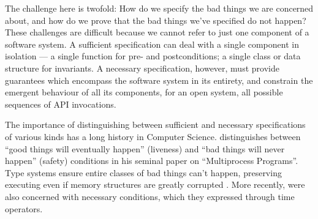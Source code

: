 
The challenge here is twofold: How do we specify the bad things we are
concerned about, and how do we prove that the bad things we've
specified do not happen?  These challenges are difficult because we
cannot refer to just one component of a software system.  A sufficient
specification can deal with a single component in isolation --- a
single function for pre- and postconditions; a single class or data
structure for invariants. A necessary specification, however, must
provide guarantees which encompass the software system in its
entirety, and constrain the emergent behaviour of all its components,
for an open system, all possible sequences of API invocations.




The importance of distinguishing between sufficient and necessary
specifications of various kinds has a long history in Computer
Science. \citeauthor{Lamport77} distinguishes between ``good things
will eventually happen'' (liveness) and ``bad things will never
happen'' (safety) conditions in his seminal paper on ``Multiprocess
Programs''.  Type systems ensure entire classes of bad things can't
happen, preserving executing even if memory structures are greatly
corrupted \cite{Rinard03}.
More recently, \citeauthor{FASE} were also concerned with 
 necessary conditions, which they expressed through time operators.

 
